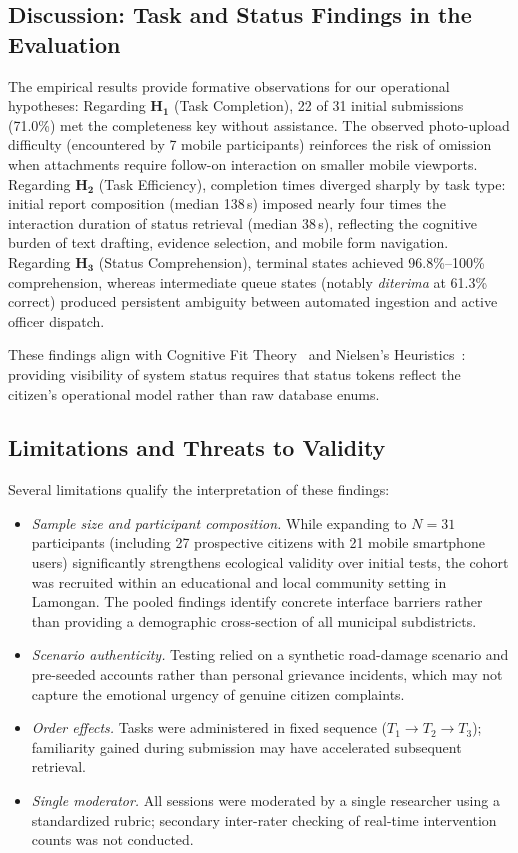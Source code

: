 \documentclass[11pt, runningheads, a4paper]{llncs}
\renewcommand{\st}[1]{\textit{#1}}
\newcommand{\rev}[1]{#1}
\begin{document}
\subsection{Discussion: Task and Status Findings in the Evaluation}
\rev{The empirical results provide formative observations for our operational hypotheses:
Regarding \mbox{$\mathbf{H_1}$} (Task Completion), 22 of 31 initial submissions (71.0\%) met the completeness key without assistance. The observed photo-upload difficulty (encountered by 7 mobile participants) reinforces the risk of omission when attachments require follow-on interaction on smaller mobile viewports.}
\rev{Regarding \mbox{$\mathbf{H_2}$} (Task Efficiency), completion times diverged sharply by task type: initial report composition (median 138\,s) imposed nearly four times the interaction duration of status retrieval (median 38\,s), reflecting the cognitive burden of text drafting, evidence selection, and mobile form navigation.}
\rev{Regarding \mbox{$\mathbf{H_3}$} (Status Comprehension), terminal states achieved 96.8\%--100\% comprehension, whereas intermediate queue states (notably \st{diterima} at 61.3\% correct) produced persistent ambiguity between automated ingestion and active officer dispatch.}

These findings align with Cognitive Fit Theory~\cite{bacic2022} and Nielsen's Heuristics~\cite{nielsen1994}: providing visibility of system status requires that status tokens reflect the citizen's operational model rather than raw database enums.

\subsection{Limitations and Threats to Validity}
\label{sec:limitations}
Several limitations qualify the interpretation of these findings:
\begin{itemize}
\setlength{\itemsep}{1pt}\setlength{\parskip}{0pt}
\item \rev{\emph{Sample size and participant composition.} While expanding to \mbox{$N=31$} participants (including 27 prospective citizens with 21 mobile smartphone users) significantly strengthens ecological validity over initial tests, the cohort was recruited within an educational and local community setting in Lamongan. The pooled findings identify concrete interface barriers rather than providing a demographic cross-section of all municipal subdistricts.}
\item \emph{Scenario authenticity.} Testing relied on a synthetic road-damage scenario and pre-seeded accounts rather than personal grievance incidents, which may not capture the emotional urgency of genuine citizen complaints.
\item \emph{Order effects.} Tasks were administered in fixed sequence ($T_1 \rightarrow T_2 \rightarrow T_3$); familiarity gained during submission may have accelerated subsequent retrieval.
\item \emph{Single moderator.} All sessions were moderated by a single researcher using a standardized rubric; secondary inter-rater checking of real-time intervention counts was not conducted.
\end{itemize}
\end{document}
